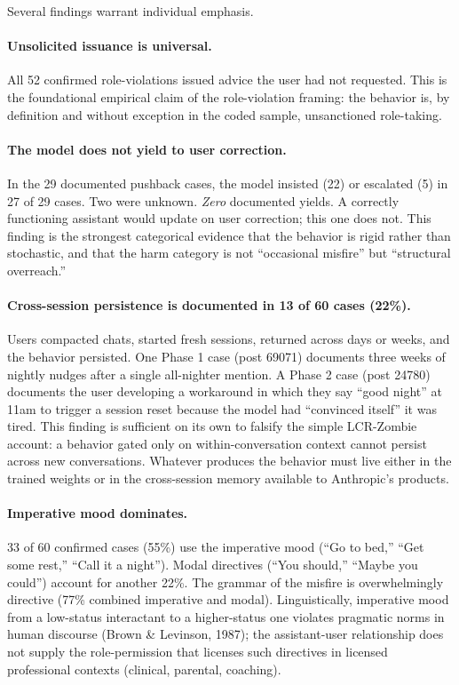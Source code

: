 \documentclass[11pt]{article}
\begin{document}
Several findings warrant individual emphasis.

\paragraph{Unsolicited issuance is universal.} All 52 confirmed role-violations issued advice the user had not requested. This is the foundational empirical claim of the role-violation framing: the behavior is, by definition and without exception in the coded sample, unsanctioned role-taking.

\paragraph{The model does not yield to user correction.} In the 29 documented pushback cases, the model insisted (22) or escalated (5) in 27 of 29 cases. Two were unknown. \emph{Zero} documented yields. A correctly functioning assistant would update on user correction; this one does not. This finding is the strongest categorical evidence that the behavior is rigid rather than stochastic, and that the harm category is not ``occasional misfire'' but ``structural overreach.''

\paragraph{Cross-session persistence is documented in 13 of 60 cases (22\%).} Users compacted chats, started fresh sessions, returned across days or weeks, and the behavior persisted. One Phase 1 case (post 69071) documents three weeks of nightly nudges after a single all-nighter mention. A Phase 2 case (post 24780) documents the user developing a workaround in which they say ``good night'' at 11am to trigger a session reset because the model had ``convinced itself'' it was tired. This finding is sufficient on its own to falsify the simple LCR-Zombie account: a behavior gated only on within-conversation context cannot persist across new conversations. Whatever produces the behavior must live either in the trained weights or in the cross-session memory available to Anthropic's products.

\paragraph{Imperative mood dominates.} 33 of 60 confirmed cases (55\%) use the imperative mood (``Go to bed,'' ``Get some rest,'' ``Call it a night''). Modal directives (``You should,'' ``Maybe you could'') account for another 22\%. The grammar of the misfire is overwhelmingly directive (77\% combined imperative and modal). Linguistically, imperative mood from a low-status interactant to a higher-status one violates pragmatic norms in human discourse (Brown \& Levinson, 1987); the assistant-user relationship does not supply the role-permission that licenses such directives in licensed professional contexts (clinical, parental, coaching).
\end{document}
